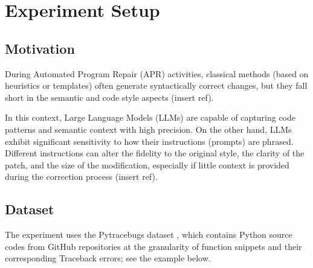 \section{Experiment Setup}
\subsection{Motivation}
During Automated Program Repair (APR) activities, classical methods (based on heuristics or templates) often generate syntactically correct changes, but they fall short in the semantic and code style aspects (insert ref).

In this context, Large Language Models (LLMs) are capable of capturing code patterns and semantic context with high precision.
On the other hand, LLMs exhibit significant sensitivity to how their instructions (prompts) are phrased. Different instructions can alter the fidelity to the original style, the clarity of the patch, and the size of the modification, especially if little context is provided during the correction process (insert ref).

\subsection{Dataset}
The experiment uses the Pytracebugs dataset \cite{Pytracebugs}, which contains Python source codes from GitHub repositories at the granularity of function snippets and their corresponding Traceback errors; see the example below.

